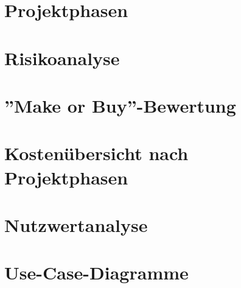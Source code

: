 
\begin{appendices}

	
	\section{Projektphasen}		
		
		\newpage

	\section{Risikoanalyse}		
		
		\newpage		
		
	\section{''Make or Buy''-Bewertung}		
		
		\newpage
	
	\section{Kosten\"ubersicht nach Projektphasen}		
		
		\newpage

	\section{Nutzwertanalyse}		
		
		\newpage
		
	\section{Use-Case-Diagramme}		
		
		\newpage		
		
\end{appendices}
